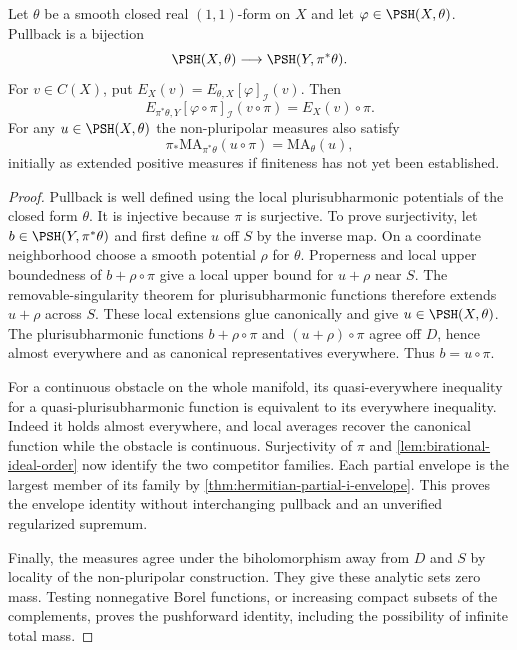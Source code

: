 \begin{proposition}\label{prop:birational-partial-envelopes}
Let $\theta$ be a smooth closed real $(1,1)$-form on $X$ and let $\varphi\in\PSH(X,\theta)$. Pullback is a bijection
\[
 \PSH(X,\theta)\longrightarrow\PSH(Y,\pi^*\theta).
\]
For $v\in C(X)$, put $E_X(v)=E_{\theta,X}[\varphi]_{\mathcal I}(v)$. Then
\[
 E_{\pi^*\theta,Y}[\varphi\circ\pi]_{\mathcal I}(v\circ\pi)
       =E_X(v)\circ\pi.
\]
For any $u\in\PSH(X,\theta)$ the non-pluripolar measures also satisfy
\[
 \pi_*\mathrm{MA}_{\pi^*\theta}(u\circ\pi)
       =\mathrm{MA}_\theta(u),
\]
initially as extended positive measures if finiteness has not yet been established.
\end{proposition}
\begin{proof}
Pullback is well defined using the local plurisubharmonic potentials of the closed form $\theta$. It is injective because $\pi$ is surjective. To prove surjectivity, let $b\in\PSH(Y,\pi^*\theta)$ and first define $u$ off $S$ by the inverse map. On a coordinate neighborhood choose a smooth potential $\rho$ for $\theta$. Properness and local upper boundedness of $b+\rho\circ\pi$ give a local upper bound for $u+\rho$ near $S$. The removable-singularity theorem for plurisubharmonic functions therefore extends $u+\rho$ across $S$. These local extensions glue canonically and give $u\in\PSH(X,\theta)$. The plurisubharmonic functions $b+\rho\circ\pi$ and $(u+\rho)\circ\pi$ agree off $D$, hence almost everywhere and as canonical representatives everywhere. Thus $b=u\circ\pi$.

For a continuous obstacle on the whole manifold, its quasi-everywhere inequality for a quasi-plurisubharmonic function is equivalent to its everywhere inequality. Indeed it holds almost everywhere, and local averages recover the canonical function while the obstacle is continuous. Surjectivity of $\pi$ and \cref{lem:birational-ideal-order} now identify the two competitor families. Each partial envelope is the largest member of its family by \cref{thm:hermitian-partial-i-envelope}. This proves the envelope identity without interchanging pullback and an unverified regularized supremum.

Finally, the measures agree under the biholomorphism away from $D$ and $S$ by locality of the non-pluripolar construction. They give these analytic sets zero mass. Testing nonnegative Borel functions, or increasing compact subsets of the complements, proves the pushforward identity, including the possibility of infinite total mass.
\end{proof}

